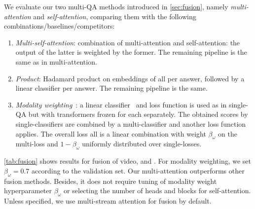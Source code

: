 \documentclass[10pt,twocolumn,letterpaper]{article}
\makeatletter
\renewcommand\paragraph{\@startsection{paragraph}{4}{\z@}{1ex}{-1em}{\normalfont\normalsize\bfseries}}
\makeatother
\begin{document}
\paragraph{Multi-\branch results} 

We evaluate our two multi-\branch QA methods introduced in \autoref{sec:fusion}, namely \emph{multi-\branch attention} and \emph{self-attention}, comparing them with the following combinations/baselines/competitors:\\

\begin{enumerate}[itemsep=3pt, parsep=0pt, topsep=2pt]
	\item \emph{Multi-\branch self-attention}: combination of multi-\branch attention and self-attention: the output of the latter is weighted by the former. The remaining pipeline is the same as in multi-\branch attention.
	\item \emph{Product}: Hadamard product on embeddings of all \branches per answer, followed by a linear classifier per answer. The remaining pipeline is the same.
	\item \emph{Modality weighting}~\cite{garcia2020knowledge}: a linear classifier~ and loss function is used as in single-\branch QA but with transformers frozen for each \branch separately. The obtained scores by single-\branch classifiers are combined by a multi-\branch classifier and another loss function applies. The overall loss all is a linear combination with weight $\beta_\omega$ on the multi-\branch loss and $1-\beta_\omega$ uniformly distributed over single-\branch losses.
\end{enumerate}

\autoref{tab:fusion} shows results for fusion of video, \sceneSum and \episodeSum. For modality weighting, we set $\beta_\omega = 0.7$ according to the validation set. Our multi-\branch attention outperforms other fusion methods. Besides, it does not require tuning of modality weight hyperparameter $\beta_\omega$ or selecting the number of heads and blocks for self-attention. Unless specified, we use multi-stream attention for fusion by default.
\end{document}
